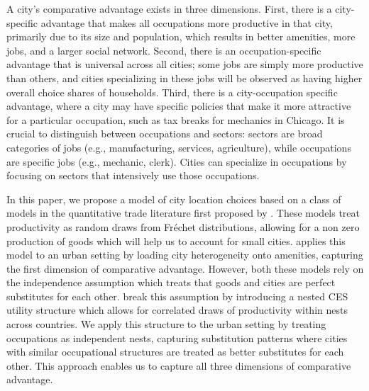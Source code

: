 \documentclass[10pt]{article}
\begin{document}
A city's comparative advantage exists in three dimensions. First, there is a city-specific advantage that makes all occupations more productive in that city, primarily due to its size and population, which results in better amenities, more jobs, and a larger social network. Second, there is an occupation-specific advantage that is universal across all cities; some jobs are simply more productive than others, and cities specializing in these jobs will be observed as having higher overall choice shares of households. Third, there is a city-occupation specific advantage, where a city may have specific policies that make it more attractive for a particular occupation, such as tax breaks for mechanics in Chicago. It is crucial to distinguish between occupations and sectors: sectors are broad categories of jobs (e.g., manufacturing, services, agriculture), while occupations are specific jobs (e.g., mechanic, clerk). Cities can specialize in occupations by focusing on sectors that intensively use those occupations.

In this paper, we propose a model of city location choices based on a class of models in the quantitative trade literature first proposed by \cite{ek}. These models treat productivity as random draws from Fr\'{e}chet distributions, allowing for a non zero production of goods which will help us to account for small cities. \cite{redding} applies this model to an urban setting by loading city heterogeneity onto amenities, capturing the first dimension of comparative advantage. However, both these models rely on the independence assumption which treats that goods and cities are perfect substitutes for each other. \cite{lindandramondo} break this assumption by introducing a nested CES utility structure which allows for correlated draws of productivity within nests across countries. We apply this structure to the urban setting by treating occupations as independent nests, capturing substitution patterns where cities with similar occupational structures are treated as better substitutes for each other. This approach enables us to capture all three dimensions of comparative advantage.
\end{document}
